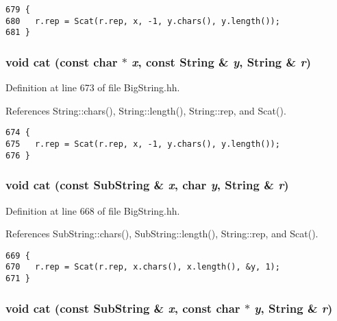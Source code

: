 \footnotesize\begin{verbatim}679 {
680   r.rep = Scat(r.rep, x, -1, y.chars(), y.length());
681 }
\end{verbatim}\normalsize 
{}
\subsubsection{\setlength{\rightskip}{0pt plus 5cm}void cat (const char $\ast$ {\em x}, const {\bf String} \& {\em y}, {\bf String} \& {\em r})\hspace{0.3cm}{\tt  [inline]}}\label{BigString_8hh_a42}




Definition at line 673 of file Big\-String.hh.

References String::chars(), String::length(), String::rep, and Scat().



\footnotesize\begin{verbatim}674 {
675   r.rep = Scat(r.rep, x, -1, y.chars(), y.length());
676 }
\end{verbatim}\normalsize 
{}
\subsubsection{\setlength{\rightskip}{0pt plus 5cm}void cat (const {\bf Sub\-String} \& {\em x}, char {\em y}, {\bf String} \& {\em r})\hspace{0.3cm}{\tt  [inline]}}\label{BigString_8hh_a41}




Definition at line 668 of file Big\-String.hh.

References Sub\-String::chars(), Sub\-String::length(), String::rep, and Scat().



\footnotesize\begin{verbatim}669 {
670   r.rep = Scat(r.rep, x.chars(), x.length(), &y, 1);
671 }
\end{verbatim}\normalsize 
{}
\subsubsection{\setlength{\rightskip}{0pt plus 5cm}void cat (const {\bf Sub\-String} \& {\em x}, const char $\ast$ {\em y}, {\bf String} \& {\em r})\hspace{0.3cm}{\tt  [inline]}}\label{BigString_8hh_a40}




